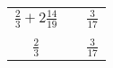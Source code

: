 \documentclass[a4paper,12pt]{article}
\begin{document}
\begin{tabular}{ccc}
$\frac{2}{3} + 2\frac{14}{19}$ & \hspace{1 cm} & $\frac{3}{17}$\\\\
$\frac{2}{3}$ & \hspace{1 cm} & $\frac{3}{17}$
\end{tabular}
\end{document}
